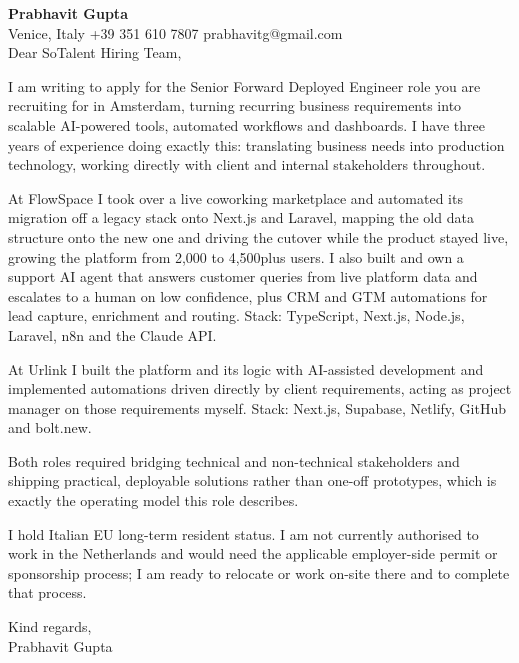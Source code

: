 \documentclass[a4paper,10.5pt]{article}
\begin{document}
\textbf{Prabhavit Gupta}\\
Venice, Italy \textbar{} +39 351 610 7807 \textbar{} prabhavitg@gmail.com\\[10pt]
Dear SoTalent Hiring Team,

I am writing to apply for the Senior Forward Deployed Engineer role you are recruiting for in Amsterdam, turning recurring business requirements into scalable AI-powered tools, automated workflows and dashboards. I have three years of experience doing exactly this: translating business needs into production technology, working directly with client and internal stakeholders throughout.

At FlowSpace I took over a live coworking marketplace and automated its migration off a legacy stack onto Next.js and Laravel, mapping the old data structure onto the new one and driving the cutover while the product stayed live, growing the platform from 2,000 to 4,500plus users. I also built and own a support AI agent that answers customer queries from live platform data and escalates to a human on low confidence, plus CRM and GTM automations for lead capture, enrichment and routing. Stack: TypeScript, Next.js, Node.js, Laravel, n8n and the Claude API.

At Urlink I built the platform and its logic with AI-assisted development and implemented automations driven directly by client requirements, acting as project manager on those requirements myself. Stack: Next.js, Supabase, Netlify, GitHub and bolt.new.

Both roles required bridging technical and non-technical stakeholders and shipping practical, deployable solutions rather than one-off prototypes, which is exactly the operating model this role describes.

I hold Italian EU long-term resident status. I am not currently authorised to work in the Netherlands and would need the applicable employer-side permit or sponsorship process; I am ready to relocate or work on-site there and to complete that process.

Kind regards,\\
Prabhavit Gupta
\end{document}
